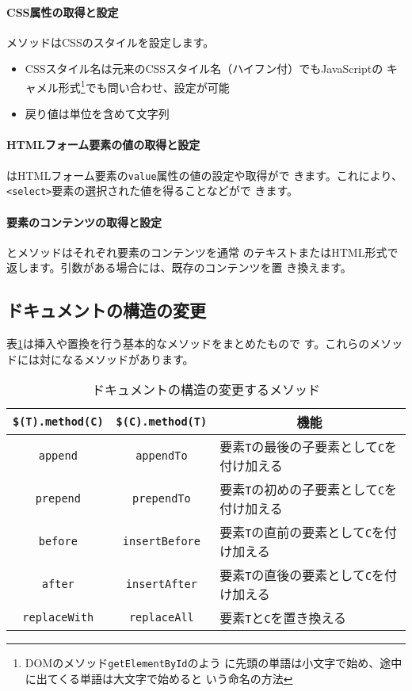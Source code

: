 \paragraph{CSS属性の取得と設定}
メソッドはCSSのスタイルを設定します。
\begin{itemize}
 \item CSSスタイル名は元来のCSSスタイル名（ハイフン付）でもJavaScriptの
       キャメル形式\footnote{DOMのメソッド\texttt{getElementById}のよう
       に先頭の単語は小文字で始め、途中に出てくる単語は大文字で始めると
       いう命名の方法}でも問い合わせ、設定が可能
 \item 戻り値は単位を含めて文字列
\end{itemize}
\paragraph{HTMLフォーム要素の値の取得と設定}
はHTMLフォーム要素の\texttt{value}属性の値の設定や取得がで
きます。これにより、\texttt{<select>}要素の選択された値を得ることなどがで
きます。
\paragraph{要素のコンテンツの取得と設定}
とメソッドはそれぞれ要素のコンテンツを通常
のテキストまたはHTML形式で返します。引数がある場合には、既存のコンテンツを置
き換えます。
\subsection{ドキュメントの構造の変更}
表\ref{Insertreplace}は挿入や置換を行う基本的なメソッドをまとめたもので
す。これらのメソッドには対になるメソッドがあります。
\begin{table}[ht]
 \caption{ドキュメントの構造の変更するメソッド}\label{Insertreplace}
 \centering
 \begin{tabular}{|c|c|l|}
 \hline
 \texttt{\$(T).method(C)}&\texttt{\$(C).method(T)}&
    \multicolumn{1}{c|}{機能}\\\hline
 \texttt{append}&\texttt{appendTo}&
	 要素\texttt{T}の最後の子要素として\texttt{C}を付け加える\\ \hline
 \texttt{prepend}&\texttt{prependTo}&
	 要素\texttt{T}の初めの子要素として\texttt{C}を付け加える\\ \hline
 \texttt{before}&\texttt{insertBefore}&
	 要素\texttt{T}の直前の要素として\texttt{C}を付け加える\\ \hline
 \texttt{after}&\texttt{insertAfter}&
	 要素\texttt{T}の直後の要素として\texttt{C}を付け加える\\ \hline
 \texttt{replaceWith}&\texttt{replaceAll}&
	 要素\texttt{T}と\texttt{C}を置き換える\\ \hline
 \end{tabular}\end{table}


